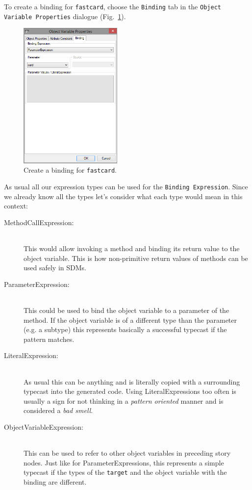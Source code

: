 To create a binding for \texttt{fastcard}, choose the \texttt{Binding} tab in
the \texttt{Object Variable Properties} dialogue
(Fig.~\ref{fig:sdm_fastcard_3}). 

\begin{figure}[htbp]
\begin{center}
  \includegraphics[width=0.45\textwidth]{pics/sdmBilder/bindings/fastcard_bindingexp.png}
  \caption{Create a binding for \texttt{fastcard}.}  
  \label{fig:sdm_fastcard_3}
\end{center}
\end{figure}

As usual all our expression types can be used for the \texttt{Binding
Expression}.  Since we already know all the types let's consider what each type
would mean in this context: 
\begin{description}
  \item[MethodCallExpression:]~\\ This would allow invoking a method and binding
  its return value to the object variable.  This is how non-primitive return
  values of methods can be used safely in SDMs.
  \item[ParameterExpression:]~\\ This could be used to bind the object variable
  to a parameter of the method.  If the object variable is of a different type
  than the parameter (e.g. a subtype) this represents basically a successful
  typecast if the pattern matches.
  \item[LiteralExpression:]~\\ As usual this can be anything and is literally
  copied with a surrounding typecast into the generated code.  Using
  LiteralExpressions too often is usually a sign for not thinking in a
  \emph{pattern oriented} manner and is considered a \emph{bad smell}.
  \item[ObjectVariableExpression:]~\\ This can be used to refer to other object
  variables in preceding story nodes.  Just like for ParameterExpressions, this
  represents a simple typecast if the types of the \texttt{target} and the
  object variable with the binding are different.
\end{description}

